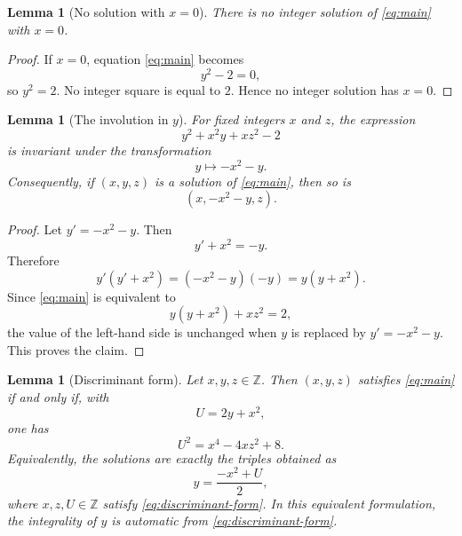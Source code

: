 \documentclass[11pt]{article}
\newtheorem{lemma}[theorem]{Lemma}
\theoremstyle{remark}
\newcommand{\Z}{\mathbb Z}
\begin{document}
\begin{lemma}[No solution with $x=0$]\label{lem:x-zero}
There is no integer solution of \eqref{eq:main} with $x=0$.
\end{lemma}

\begin{proof}
If $x=0$, equation \eqref{eq:main} becomes
\[
        y^2-2=0,
\]
so $y^2=2$.  No integer square is equal to $2$.  Hence no integer solution has $x=0$.
\end{proof}

\begin{lemma}[The involution in $y$]\label{lem:involution}
For fixed integers $x$ and $z$, the expression
\[
        y^2+x^2y+xz^2-2
\]
is invariant under the transformation
\begin{equation}\label{eq:involution}
        y\longmapsto -x^2-y.
\end{equation}
Consequently, if $(x,y,z)$ is a solution of \eqref{eq:main}, then so is
\[
        (x,-x^2-y,z).
\]
\end{lemma}

\begin{proof}
Let $y'=-x^2-y$.  Then
\[
        y'+x^2=-y.
\]
Therefore
\[
        y'(y'+x^2)=(-x^2-y)(-y)=y(y+x^2).
\]
Since \eqref{eq:main} is equivalent to
\[
        y(y+x^2)+xz^2=2,
\]
the value of the left-hand side is unchanged when $y$ is replaced by $y'=-x^2-y$.  This proves the claim.
\end{proof}

\begin{lemma}[Discriminant form]\label{lem:discriminant}
Let $x,y,z\in\Z$.  Then $(x,y,z)$ satisfies \eqref{eq:main} if and only if, with
\begin{equation}\label{eq:U-def}
        U=2y+x^2,
\end{equation}
one has
\begin{equation}\label{eq:discriminant-form}
        U^2=x^4-4xz^2+8.
\end{equation}
Equivalently, the solutions are exactly the triples obtained as
\begin{equation}\label{eq:y-from-discriminant}
        y=\frac{-x^2+U}{2},
\end{equation}
where $x,z,U\in\Z$ satisfy \eqref{eq:discriminant-form}.
In this equivalent formulation, the integrality of $y$ is automatic from \eqref{eq:discriminant-form}.
\end{lemma}
\end{document}
